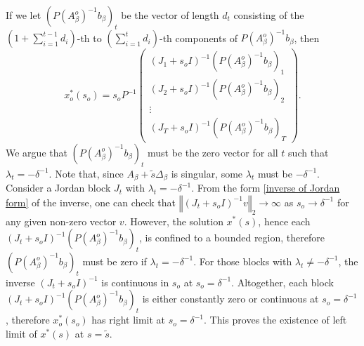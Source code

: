 \documentclass[mnsc,blindrev]{informs4} %
\newcommand{\norm}[1]{\left \Vert #1 \right\Vert}
\newcommand{\prth}[1]{\left(#1\right)}
\begin{document}
If we let $(P(A_{\beta}^o)^{-1}b_{\beta})_t$ be the vector of length $d_t$ consisting of the $(1+\sum_{i=1}^{t-1}d_i)$-th to $(\sum_{i=1}^td_i)$-th components of $P(A_{\beta}^o)^{-1}b_{\beta}$, then
$$x^*_o(s_o)=s_oP^{-1}\prth{\begin{matrix} %
      (J_1+s_oI)^{-1}(P(A_{\beta}^o)^{-1}b_{\beta})_1 \\
       (J_2+s_oI)^{-1}(P(A_{\beta}^o)^{-1}b_{\beta})_2\\
       \vdots\\
       (J_T+s_oI)^{-1}(P(A_{\beta}^o)^{-1}b_{\beta})_T
   \end{matrix}}.$$
We argue that $(P(A_{\beta}^o)^{-1}b_{\beta})_t$ must be the zero vector for all $t$ such that $\lambda_t=-\delta^{-1}$. Note that, since $A_{\beta}+\tilde s\Delta_{\beta}$ is singular, some $\lambda_t$ must be $-\delta^{-1}$. Consider a Jordan block $J_t$ with $\lambda_t=-\delta^{-1}$. From the form \eqref{inverse of Jordan form} of the inverse, one can check that $\norm{(J_t+s_oI)^{-1}v}_2\to\infty$ as $s_o\to\delta^{-1}$ for any given non-zero vector $v$. However, the solution $x^*(s)$, hence each $(J_t+s_oI)^{-1}(P(A_{\beta}^o)^{-1}b_{\beta})_t$, is confined to a bounded region, therefore $(P(A_{\beta}^o)^{-1}b_{\beta})_t$ must be zero if $\lambda_t=-\delta^{-1}$. For those blocks with $\lambda_t\neq -\delta^{-1}$, the inverse $(J_t+s_oI)^{-1}$ is continuous in $s_o$ at $s_o=\delta^{-1}$. Altogether, each block $(J_t+s_oI)^{-1}(P(A_{\beta}^o)^{-1}b_{\beta})_t$ is either constantly zero or continuous at $s_o=\delta^{-1}$, therefore $x^*_o(s_o)$ has right limit at $s_o=\delta^{-1}$. This proves the existence of left limit of $x^*(s)$ at $s=\tilde s$.\hfill\Halmos
\end{document}
